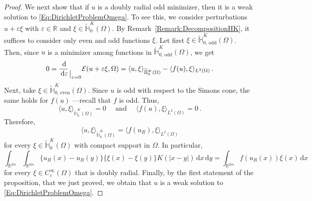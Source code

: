 \documentclass[12pt,reqno]{amsart}
\theoremstyle{definition}
\theoremstyle{remark}
\newcommand{\con}[1]{\mathbb{#1}}
\newcommand{\R}{\con{R}} %
\renewcommand{\H}{\con{H}}
\newcommand{\ecal}{\mathcal{E}}
\renewcommand{\d}{\,\mathrm{d}} %
\newcommand\evalat[1]{_{\mkern1.5mu\big\vert_{\scriptstyle #1}}}
\numberwithin{equation}{section}
\begin{document}
\begin{proof}
	
	We next show that if $u$ is a doubly radial odd minimizer, then it is a weak solution to \eqref{Eq:DirichletProblemOmega}. To see this, we consider perturbations $u +  \varepsilon \xi$ with $\varepsilon\in \R$ and $\xi \in \widetilde{\H}^K_{0}(\Omega)$. By Remark~\ref{Remark:DecompositionHK}, it suffices to consider only even and odd functions $\xi$. Let first $\xi \in \widetilde{\H}^K_{0, \,\mathrm{odd}}(\Omega)$. Then, since $u$ is a minimizer among functions in $\widetilde{\H}^K_{0, \,\mathrm{odd}}(\Omega)$, we get
	$$
	0 = \dfrac{\d}{\d \varepsilon}\evalat{\varepsilon = 0} \ecal(u +  \varepsilon \xi, \Omega) = \langle u,\xi \rangle_{\widetilde{\H}^K_0(\Omega)} - \langle f(u),\xi \rangle_{L^2(\Omega)}\,.
	$$
	Next, take $\xi \in \widetilde{\H}^K_{0, \,\mathrm{even}}(\Omega)$. Since $u$ is odd with respect to the Simons cone, the same holds for $f(u)$ ---recall that $f$ is odd. Thus,
	$$
	\langle u,\xi \rangle_{\widetilde{\H}^K_0(\Omega)} = 0 \quad \textrm{ and } \quad  \langle f(u),\xi \rangle_{L^2(\Omega)} = 0\,.
	$$
	Therefore, 
	$$
	\langle u,\xi \rangle_{\widetilde{\H}^K_0(\Omega)} = \langle f(u_R),\xi \rangle_{L^2(\Omega)}
	$$
	for every $\xi \in\widetilde{\H}^K_0(\Omega)$ with compact support in  $\Omega$. In particular,
	$$
	\int_{\R^{2m}}\int_{\R^{2m}} \{u_R(x)-u_R(y)\}\{\xi(x)-\xi(y)\} K(|x-y|) \d x \d y = \int_{\R^{2m}} f(u_R(x)) \xi(x) \d x
	$$
	for every $\xi \in C^\infty_c(\Omega)$ that is doubly radial. Finally, by the first statement of the proposition, that we just proved, we obtain that $u$ is a weak solution to \eqref{Eq:DirichletProblemOmega}.
\end{proof}
\end{document}
